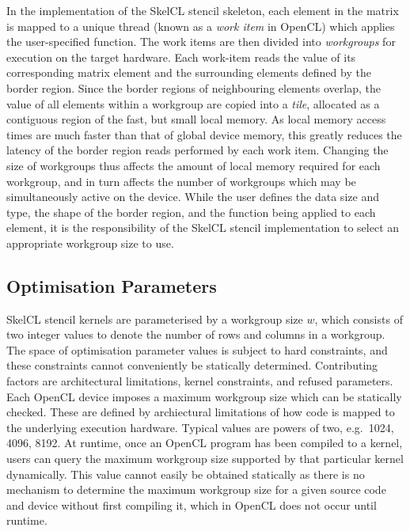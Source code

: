 \documentclass[nonatbib,preprint,9pt]{sigplanconf}
\begin{document}
In the implementation of the SkelCL stencil skeleton, each element in
the matrix is mapped to a unique thread (known as a \emph{work item}
in OpenCL) which applies the user-specified function. The work items
are then divided into \emph{workgroups} for execution on the target
hardware. Each work-item reads the value of its corresponding matrix
element and the surrounding elements defined by the border
region. Since the border regions of neighbouring elements overlap, the
value of all elements within a workgroup are copied into a
\emph{tile}, allocated as a contiguous region of the fast, but small
local memory. As local memory access times are much faster than that
of global device memory, this greatly reduces the latency of the
border region reads performed by each work item. Changing the size of
workgroups thus affects the amount of local memory required for each
workgroup, and in turn affects the number of workgroups which may be
simultaneously active on the device. While the user defines the data
size and type, the shape of the border region, and the function being
applied to each element, it is the responsibility of the SkelCL
stencil implementation to select an appropriate workgroup size to use.

\subsection{Optimisation Parameters}\label{subsec:op-params}

SkelCL stencil kernels are parameterised by a workgroup size $w$,
which consists of two integer values to denote the number of rows and
columns in a workgroup. The space of optimisation parameter values is
subject to hard constraints, and these constraints cannot conveniently
be statically determined. Contributing factors are architectural
limitations, kernel constraints, and refused parameters.  Each OpenCL
device imposes a maximum workgroup size which can be statically
checked. These are defined by archiectural limitations of how code is
mapped to the underlying execution hardware. Typical values are powers
of two, e.g.\ 1024, 4096, 8192. At runtime, once an OpenCL program has
been compiled to a kernel, users can query the maximum workgroup size
supported by that particular kernel dynamically. This value cannot
easily be obtained statically as there is no mechanism to determine
the maximum workgroup size for a given source code and device without
first compiling it, which in OpenCL does not occur until runtime.
\end{document}
